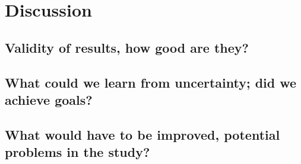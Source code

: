 \chapter{Discussion}
\label{chapter:discussion}

\section{Validity of results, how good are they?}

\section{What could we learn from uncertainty; did we achieve goals?}

\section{What would have to be improved, potential problems in the study? }
